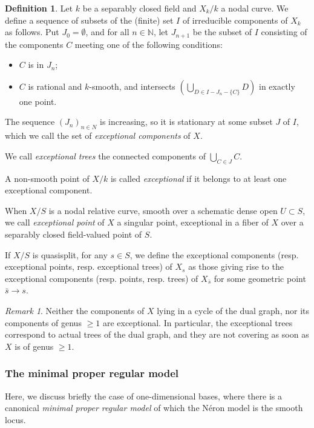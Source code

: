 \documentclass[a4paper,10pt,twoside]{article}
\newcommand{\ra}{\rightarrow}
\newcommand{\N}{\mathbb{N}}
\theoremstyle{definition}
\newtheorem{defi}[thm]{Definition}
\theoremstyle{remark}
\newtheorem{rem}{Remark}[thm]
\begin{document}
\begin{defi}\label{definition exceptional point/component/tree}
Let $k$ be a separably closed field and $X_k/k$ a nodal curve. We define a sequence of subsets of the (finite) set $I$ of irreducible components of $X_k$ as follows. Put $J_0=\emptyset$, and for all $n\in\N$, let $J_{n+1}$ be the subset of $I$ consisting of the components $C$ meeting one of the following conditions:
\begin{itemize}
\item $C$ is in $J_n$;
\item $C$ is rational and $k$-smooth, and intersects $\left(\bigcup\limits_{D\in I-J_n-\{C\}} D\right)$ in exactly one point.
\end{itemize}
The sequence $(J_n)_{n\in N}$ is increasing, so it is stationary at some subset $J$ of $I$, which we call the set of \emph{exceptional components} of $X$.

	We call \emph{exceptional trees} the connected components of $\bigcup\limits_{C\in J}C$.

	A non-smooth point of $X/k$ is called \emph{exceptional} if it belongs to at least one exceptional component.
	
	When $X/S$ is a nodal relative curve, smooth over a schematic dense open $U\subset S$, we call \emph{exceptional point} of $X$ a singular point, exceptional in a fiber of $X$ over a separably closed field-valued point of $S$.
	
	If $X/S$ is quasisplit, for any $s\in S$, we define the exceptional components (resp. exceptional points, resp. exceptional trees) of $X_s$ as those giving rise to the exceptional components (resp. points, resp. trees) of $X_{\bar s}$ for some geometric point $\bar s\ra s$.
\end{defi}

\begin{rem}
Neither the components of $X$ lying in a cycle of the dual graph, nor its components of genus $\geq 1$ are exceptional. In particular, the exceptional trees correspond to actual trees of the dual graph, and they are not covering as soon as $X$ is of genus $\geq 1$.
\end{rem}

\subsubsection{The minimal proper regular model}

Here, we discuss briefly the case of one-dimensional bases, where there is a canonical \emph{minimal proper regular model} of which the N\'eron model is the smooth locus.
\end{document}
